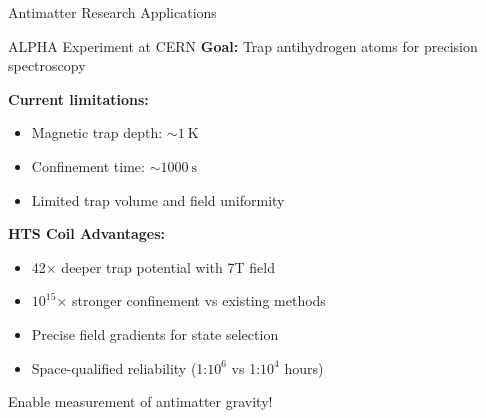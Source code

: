 \begin{frame}{Antimatter Research Applications}
    \begin{block}{ALPHA Experiment at CERN}
        \textbf{Goal:} Trap antihydrogen atoms for precision spectroscopy
        
        \textbf{Current limitations:}
        \begin{itemize}
            \item Magnetic trap depth: $\sim 1~\text{K}$
            \item Confinement time: $\sim 1000~\text{s}$
            \item Limited trap volume and field uniformity
        \end{itemize}
    \end{block}
    
    \vspace{0.3cm}
    \textbf{HTS Coil Advantages:}
    \begin{itemize}
        \item 42× deeper trap potential with 7T field
        \item $10^{15}$× stronger confinement vs existing methods
        \item Precise field gradients for state selection
        \item Space-qualified reliability (1:$10^6$ vs 1:$10^4$ hours)
    \end{itemize}
    
    \vspace{0.3cm}
     Enable measurement of antimatter gravity!
\end{frame}

